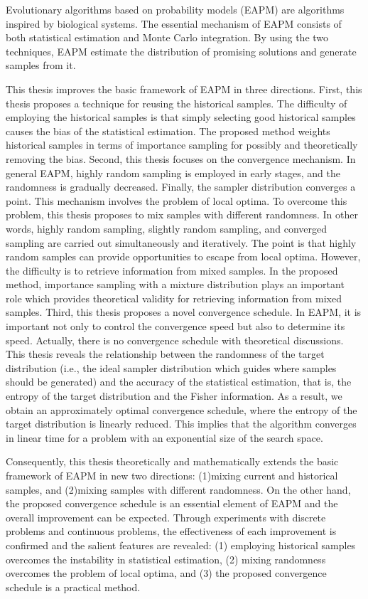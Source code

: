Evolutionary algorithms based on probability models (EAPM)
are algorithms inspired by biological systems.
The essential mechanism of EAPM consists of both
statistical estimation and Monte Carlo integration.
By using the two techniques, 
EAPM estimate the distribution of
promising solutions and generate samples from it. 

This thesis improves the basic framework of EAPM
in three directions.
First, this thesis proposes a technique for reusing 
the historical samples.
The difficulty of employing the historical samples is
that
simply selecting good historical samples causes 
the bias of the statistical estimation.
The proposed method weights historical samples
in terms of importance sampling 
for possibly and theoretically removing the bias.
Second,
this thesis focuses on the convergence mechanism.
In general EAPM,
highly random sampling is employed in early stages,
and the randomness is gradually decreased.
Finally, the sampler distribution converges a point.
This mechanism involves the problem of local optima.
To overcome this problem,
this thesis proposes to mix samples with different randomness.
In other words, highly random sampling, slightly random sampling, and
converged sampling are carried out simultaneously and iteratively.
The point is that highly random samples can provide opportunities to escape 
from local optima.
However, the difficulty is to retrieve information from mixed samples.
In the proposed method, importance sampling with a mixture distribution
plays an important role which
provides theoretical validity for retrieving information from mixed samples.
Third,
this thesis proposes a novel convergence schedule.
In EAPM,
it is important not only to control the convergence speed
but also to determine its speed.
Actually, there is no convergence schedule with theoretical discussions.
This thesis reveals the relationship between
the randomness of the target distribution
(i.e., the ideal sampler distribution which guides 
where samples should be generated)
and the accuracy of the statistical estimation,
that is,
the entropy of the target distribution and the Fisher information.
As a result, we obtain an approximately optimal convergence schedule,
where the entropy of the target distribution
is linearly reduced.
This implies that 
the algorithm converges in linear time for a problem with an exponential
size of the search space.

Consequently, this thesis theoretically and mathematically extends
the basic framework of EAPM in new two directions:
(1)mixing current and  historical samples,
 and (2)mixing samples with different randomness.
On the other hand, the proposed convergence schedule is 
an essential element of EAPM and the overall improvement can be
expected.
Through experiments with discrete problems and continuous problems,
the effectiveness of each improvement is confirmed 
and
the salient features are revealed:
(1) employing historical samples overcomes the instability
in statistical estimation,
(2) mixing randomness overcomes the problem of local optima, and
(3) the proposed convergence schedule is a practical method.